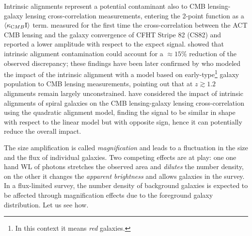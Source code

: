 Intrinsic alignments represent a potential contaminant also to \gls{CMB} lensing-galaxy lensing cross-correlation measurements, entering the 2-point function as a
$\langle \kappa_{\rm CMB}{\rm I}\rangle$ term. \citet{Hand2015} measured for the first time the 
cross-correlation between the \gls{ACT} \gls{CMB} lensing and the galaxy convergence of \gls{CFHT} Stripe 82 
(CS82) and reported a lower amplitude with respect to the expect signal. \citet{Troxel2014} showed that intrinsic
alignment contamination could account for a $\approx 15\%$ reduction of the observed discrepancy; 
these findings have been later confirmed by \citet{Chisari2015} who modeled the impact of the intrinsic 
alignment with a model based on early-type\footnote{In this context it means \emph{red} galaxies.} galaxy population to 
\gls{CMB} 
lensing measurements, pointing out that at $z\gtrsim 1.2$ alignments remain largely unconstrained. 
\citet{Larsen2015} have considered the impact of intrinsic alignments of spiral galaxies on the \gls{CMB} 
lensing-galaxy lensing cross-correlation using the quadratic alignment model, finding the signal to be
similar in shape with respect to the linear model but with opposite sign, hence it can potentially reduce
the overall impact.

The size amplification is called \emph{magnification} and leads to a fluctuation in the size and the flux of 
individual galaxies. Two competing effects are at play: one one hand \gls{WL} of photons stretches the 
observed area and \emph{dilutes} the number density, on the other it changes the \emph{apparent 
brightness} and allows galaxies in the survey. In a flux-limited survey, the number density of background 
galaxies is expected to be affected through magnification effects due to the foreground galaxy distribution. 
Let us see how.

